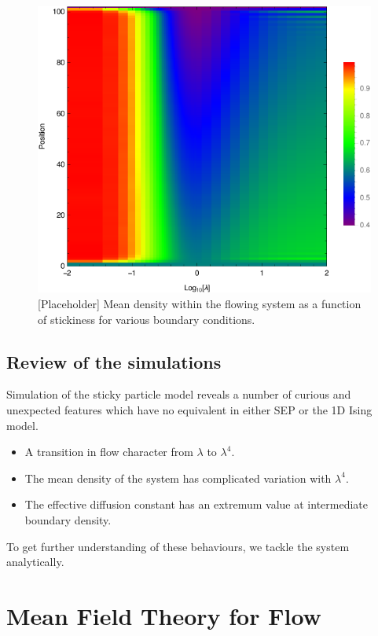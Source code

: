 \documentclass[
reprint, amsmath,amssymb, aps,
]{revtex4-1}
\begin{document}
\begin{figure}[h!]
\vspace{1em}
\begin{center}
\includegraphics[width=0.5\linewidth]{graemeDensityProfile.pdf}
\end{center}
    \vspace{-0em}
\caption{\label{fig:flowStats} [Placeholder] Mean density within the flowing system as a function of stickiness for various boundary conditions.   
}
\end{figure}


\subsection{Review of the simulations}

Simulation of the sticky particle model reveals a number of curious
and unexpected features which have no equivalent in either SEP or the
1D Ising model.

\begin{itemize} \item 
A transition in flow character from $\lambda$ to $\lambda^4$.  
\item
The mean density of the system  has complicated variation with  $\lambda^4$.  
\item 
The effective diffusion constant has an extremum value at
  intermediate boundary density.
\end{itemize}

To get further understanding of these behaviours, we tackle the system
analytically.

\section{Mean Field Theory for Flow}
  
\end{document}
